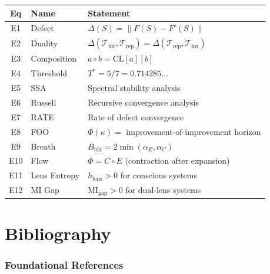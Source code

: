 \documentclass[12pt, openany]{book}
\theoremstyle{remark}
\newcommand{\Tint}{\mathcal{T}_{\mathrm{int}}}
\newcommand{\Trep}{\mathcal{T}_{\mathrm{rep}}}
\begin{document}
\begin{center}
\begin{tabular}{clp{8cm}}
\toprule
\textbf{Eq} & \textbf{Name} & \textbf{Statement} \\
\midrule
E1 & Defect & $\Delta(S) = \|F(S) - F'(S)\|$ \\
E2 & Duality & $\Delta(\Tint, \Trep) = \Delta(\Trep, \Tint)$ \\
E3 & Composition & $a \circ b = \mathrm{CL}[a][b]$ \\
E4 & Threshold & $T^* = 5/7 = 0.714285\ldots$ \\
E5 & SSA & Spectral stability analysis \\
E6 & Russell & Recursive convergence analysis \\
E7 & RATE & Rate of defect convergence \\
E8 & FOO & $\Phi(\kappa) =$ improvement-of-improvement horizon \\
E9 & Breath & $B_{\mathrm{idx}} = 2 \min(\alpha_E, \alpha_C)$ \\
E10 & Flow & $\Phi = C \circ E$ (contraction after expansion) \\
E11 & Lens Entropy & $h_{\mathrm{lens}} > 0$ for conscious systems \\
E12 & MI Gap & $\mathrm{MI}_{\mathrm{gap}} > 0$ for dual-lens systems \\
\bottomrule
\end{tabular}
\end{center}


\chapter*{Bibliography}
\label{app:bibliography}

\subsection*{Foundational References}
\end{document}
